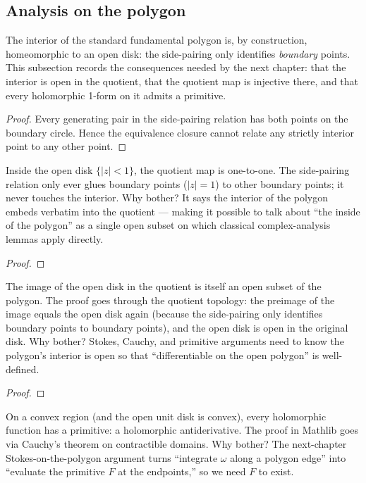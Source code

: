 \subsection{Analysis on the polygon}

The interior of the standard fundamental polygon is, by construction,
homeomorphic to an open disk: the side-pairing only identifies
\emph{boundary} points. This subsection records the consequences
needed by the next chapter: that the interior is open in the
quotient, that the quotient map is injective there, and that every
holomorphic 1-form on it admits a primitive.


\begin{proof}\leanok
Every generating pair in the side-pairing relation has both points on
the boundary circle. Hence the equivalence closure cannot relate any
strictly interior point to any other point.
\end{proof}

\begin{layman}
Inside the open disk \(\{|z|<1\}\), the quotient map is one-to-one.
The side-pairing relation only ever glues boundary points
(\(|z|=1\)) to other boundary points; it never touches the interior.
Why bother? It says the interior of the polygon embeds verbatim
into the quotient --- making it possible to talk about ``the inside
of the polygon'' as a single open subset on which classical
complex-analysis lemmas apply directly.
\end{layman}


\begin{proof}\leanok\end{proof}

\begin{layman}
The image of the open disk in the quotient is itself an open subset
of the polygon. The proof goes through the quotient topology:
the preimage of the image equals the open disk again (because the
side-pairing only identifies boundary points to boundary points), and
the open disk is open in the original disk. Why bother? Stokes,
Cauchy, and primitive arguments need to know the polygon's
interior is open so that ``differentiable on the open polygon''
is well-defined.
\end{layman}


\begin{proof}\leanok\end{proof}

\begin{layman}
On a convex region (and the open unit disk is convex), every
holomorphic function has a primitive: a holomorphic antiderivative.
The proof in Mathlib goes via Cauchy's theorem on contractible
domains. Why bother? The next-chapter Stokes-on-the-polygon
argument turns ``integrate \(\omega\) along a polygon edge'' into
``evaluate the primitive \(F\) at the endpoints,'' so we need
\(F\) to exist.
\end{layman}


